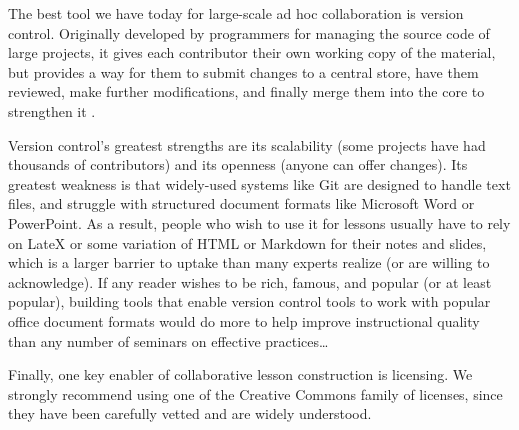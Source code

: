 \documentclass[10pt,letterpaper]{article}
\begin{document}
The best tool we have today for large-scale ad hoc collaboration is version
control.  Originally developed by programmers for managing the source code of
large projects, it gives each contributor their own working copy of the
material, but provides a way for them to submit changes to a central store,
have them reviewed, make further modifications, and finally merge them into
the core to strengthen it \cite{Blis2016}.

Version control's greatest strengths are its scalability (some projects have had
thousands of contributors) and its openness (anyone can offer changes).  Its
greatest weakness is that widely-used systems like Git are designed to handle
text files, and struggle with structured document formats like Microsoft Word or
PowerPoint.  As a result, people who wish to use it for lessons usually have to
rely on LateX or some variation of HTML or Markdown for their notes and slides,
which is a larger barrier to uptake than many experts realize (or are willing to
acknowledge).  If any reader wishes to be rich, famous, and popular (or at least
popular), building tools that enable version control tools to work with popular
office document formats would do more to help improve instructional quality than
any number of seminars on effective practices{\ldots}

Finally, one key enabler of collaborative lesson construction is licensing.  We
strongly recommend using one of the Creative Commons family of licenses, since
they have been carefully vetted and are widely understood.


\end{document}
